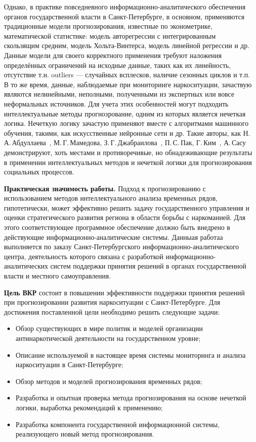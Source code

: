 Однако, в практике повседневного информационно-аналитического обеспечения
органов государственной власти в Санкт-Петербурге, в основном, применяются
традиционные модели прогнозирования, известные по эконометрике, математической
статистике: модель авторегрессии с интегрированным скользящим средним, модель
Хольта-Винтерса, модель линейной регрессии и др. Данные модели для своего
корректного применения требуют наложения определённых ограничений на исходные
данные, таких как их линейность, отсутствие т.н. outliers --- случайных
всплесков, наличие сезонных циклов и т.п. В то же время, данные, наблюдаемые при
мониторинге наркоситуации, зачаствую являются нелинейными, неполными,
полученными из экспертных или вовсе неформальных источников. Для учета этих
особенностей могут подходить интеллектуальные методы прогнозрование, одним из
которых является нечеткая логика. Нечеткую логику зачастую применяют вместе с
алгоритмами машинного обучения, такими, как искусственные нейронные сети и др.
Такие авторы, как Н.\,А.\,Абдуллаева~\cite{Abdullaeva2010}, М.\,Г.\,Мамедова,
З.\,Г.\,Джабраилова~\cite {Mamedova2005}, П.\,С.\,Пак, Г.\,Ким~\cite{Pak2005},
А.\,Сасу~\cite{Sasu2010} демонстрируют, хоть местами и противоречивые, но
обнадеживающие результаты в применении интеллектуальных методов и нечеткой
логики для прогнозирования социальных процессов. 

\textbf{Практическая значимость работы.} Подход к прогнозированию с
использованием методов интеллектуального анализа временных рядов, гипотетически,
может эффективно решить задачу государственного управления и оценки
стратегического развития региона в области борьбы с наркоманией. Для этого
соответствующее программное обеспечение должно быть внедрено в действующие
информационно-аналитические системы. Данныая работаа выполняется по заказу
Санкт-Петербургского информационно-аналитического центра, деятельность которого
связана с разработкой информационно-аналитических систем поддержки принятия
решений в органах государственной власти и местного самоуправления.

\textbf{Цель ВКР} состоит в повышении эффективности поддержки принятия решений
при прогнозировании развития наркоситуации с Санкт-Петербурге. Для достижения
поставленной цели необходимо решить следующие задачи:
\begin{itemize}
\item Обзор существующих в мире политик и моделей организации антинаркотической
деятельности на государственном уровне;
\item Описание используемой в настоящее время системы мониторинга и анализа
наркоситуации в Санкт-Петербурге;
\item Обзор методов и моделей прогнозирования временных рядов;
\item Разработка и опытная проверка метода прогнозирования на основе нечеткой
логики, выработка рекомендаций к применению;
\item Разработка компонента государственной информационной системы, реализующего
новый метод прогнозирования.
\end{itemize}



